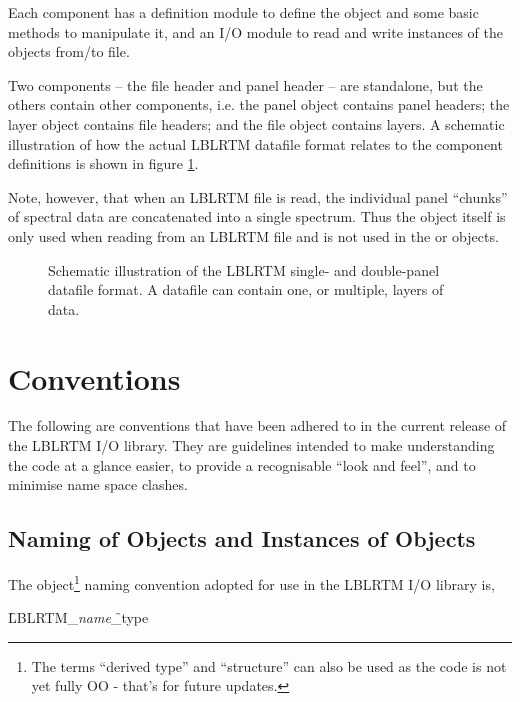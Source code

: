 Each component has a definition module to define the object and some basic methods to manipulate it, and an I/O module to read and write instances of the objects from/to file.

Two components -- the file header and panel header -- are standalone, but the others contain other components, i.e. the panel object contains panel headers; the layer object contains file headers; and the file object contains layers. A schematic illustration of how the actual LBLRTM datafile format relates to the component definitions is shown in figure \ref{fig:lblrtm_format}.

Note, however, that when an LBLRTM file is read, the individual panel ``chunks'' of spectral data are concatenated into a single spectrum. Thus the \Panel{} object itself is only used when reading from an LBLRTM file and is not used in the \File{} or \Layer{} objects.

\begin{figure}[htp]
  \centering
  
  \caption{Schematic illustration of the LBLRTM single- and double-panel datafile format. A datafile can contain one, or multiple, layers of data.}
  \label{fig:lblrtm_format}
\end{figure}



\section{Conventions}
\label{sec:conventions}
The following are conventions that have been adhered to in the current release of the LBLRTM I/O library. They are guidelines intended to make understanding the code at a glance easier, to provide a recognisable ``look and feel'', and to minimise name space clashes.



\subsection{Naming of Objects and Instances of Objects}

The object\footnote{The terms ``derived type'' and ``structure'' can also be used as the code is not yet fully OO - that's for future updates.} naming convention adopted for use in the LBLRTM I/O library is, 

\hspace{0.4cm}\f{LBLRTM\_}\textit{name}\f{\_type} 

